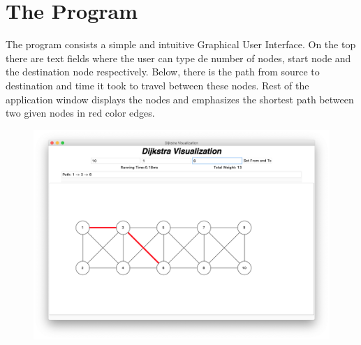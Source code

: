 \documentclass[twocolumns]{IEEEtran}
\begin{document}
	\section{The Program}

	The program consists a simple and intuitive Graphical User Interface. On the top there are text fields where the user can type de number of nodes, start node and the destination node respectively. Below, there is the path from source to destination and time it took to travel between these nodes. Rest of the application window displays the nodes and emphasizes the shortest path between two given nodes in red color edges.

	\begin{figure}[h]
		\centering
		\includegraphics[scale=.2]{main_window.png}
	\end{figure}
	
\end{document}
